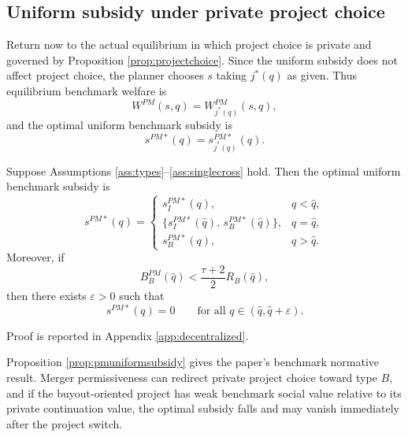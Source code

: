 \subsection{Uniform subsidy under private project choice}

Return now to the actual equilibrium in which project choice is private and governed by Proposition \ref{prop:projectchoice}. Since the uniform subsidy does not affect project choice, the planner chooses $s$ taking $j^*(q)$ as given. Thus equilibrium benchmark welfare is
\begin{equation}
    W^{PM}(s,q)=W_{j^*(q)}^{PM}(s,q),
\end{equation}
and the optimal uniform benchmark subsidy is
\begin{equation}\label{eq:sPMuniform}
    s^{PM*}(q)=s_{j^*(q)}^{PM*}(q).
\end{equation}

\begin{proposition}\label{prop:pmuniformsubsidy}
Suppose Assumptions \ref{ass:types}--\ref{ass:singlecross} hold. Then the optimal uniform benchmark subsidy is
\begin{equation}
    s^{PM*}(q)
    =
    \begin{cases}
        s_I^{PM*}(q), & q<\hat q,\\
        \{s_I^{PM*}(\hat q),\, s_B^{PM*}(\hat q)\}, & q=\hat q,\\
        s_B^{PM*}(q), & q>\hat q.
    \end{cases}
\end{equation}
Moreover, if
\begin{equation}\label{eq:pmdropzero}
    B_B^{PM}(\hat q)<\frac{\tau+2}{2}R_B(\hat q),
\end{equation}
then there exists $\varepsilon>0$ such that
\begin{equation}
    s^{PM*}(q)=0
    \qquad
    \text{for all } q\in(\hat q,\hat q+\varepsilon).
\end{equation}
\end{proposition}

Proof is reported in Appendix \ref{app:decentralized}.

Proposition \ref{prop:pmuniformsubsidy} gives the paper's benchmark normative result. Merger permissiveness can redirect private project choice toward type $B$, and if the buyout-oriented project has weak benchmark social value relative to its private continuation value, the optimal subsidy falls and may vanish immediately after the project switch.

